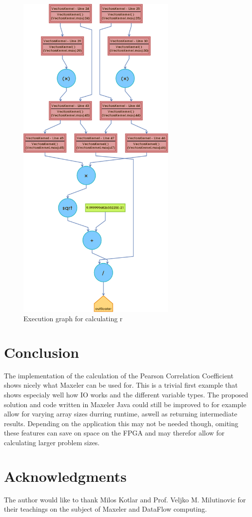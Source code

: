 \documentclass{llncs}
\begin{document}
\begin{figure}
\begin{center}
\includegraphics[width=0.7\textwidth]{Vectors-VectorsKernel-final-simulation}
\end{center}
\caption{Execution graph for calculating r}
\label{fig:execution_graph}
\end{figure}


\section{Conclusion}\label{sec:Conclusion}

The implementation of the calculation of the Pearson Correlation Coefficient shows nicely what Maxeler can be used for. This is a trivial first example that shows especialy well how IO works and the different variable types. The proposed solution and code written in Maxeler Java could still be improved to for example allow for varying array sizes durring runtime, aswell as returning intermediate results. Depending on the application this may not be needed though, omiting these features can save on space on the FPGA and may therefor allow for calculating larger problem sizes.

\section*{Acknowledgments}\label{sec:Acknowledgments}

The author would like to thank Milos Kotlar and Prof. Veljko M. Milutinovic for their teachings on the subject of Maxeler and DataFlow computing.




\end{document}
